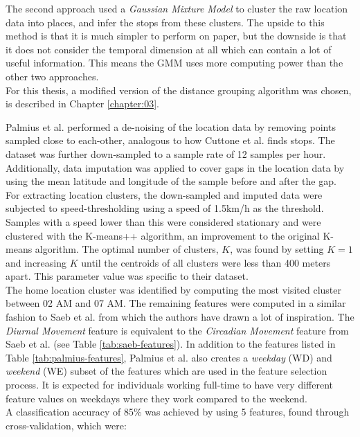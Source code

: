 The second approach used a \textit{Gaussian Mixture Model} to cluster the raw location data into places, and infer the stops from these clusters. The upside to this method is that it is much simpler to perform on paper, but the downside is that it does not consider the temporal dimension at all which can contain a lot of useful information. This means the GMM uses more computing power than the other two approaches. \\

For this thesis, a modified version of the distance grouping algorithm was chosen, is described in Chapter \ref{chapter:03}.

Palmius et al. performed a de-noising of the location data by removing points sampled close to each-other, analogous to how Cuttone et al. finds stops. The dataset was further down-sampled to a sample rate of 12 samples per hour. Additionally, data imputation was applied to cover gaps in the location data by using the mean latitude and longitude of the sample before and after the gap. \\

For extracting location clusters, the down-sampled and imputed data were subjected to speed-thresholding using a speed of 1.5km/h as the threshold. Samples with a speed lower than this were considered stationary and were clustered with the K-means++ algorithm, an improvement to the original K-means algorithm. The optimal number of clusters, $K$, was found by setting $K=1$ and increasing $K$ until the centroids of all clusters were less than 400 meters apart. This parameter value was specific to their dataset.\\

The home location cluster was identified by computing the most visited cluster between 02 AM and 07 AM. The remaining features were computed in a similar fashion to Saeb et al. from which the authors have drawn a lot of inspiration. The \textit{Diurnal Movement} feature is equivalent to the \textit{Circadian Movement }feature from Saeb et al. (see Table \ref{tab:saeb-features}). In addition to the features listed in Table \ref{tab:palmius-features}, Palmius et al. also creates a \textit{weekday} (WD) and \textit{weekend} (WE) subset of the features which are used in the feature selection process. It is expected for individuals working full-time to have very different feature values on weekdays where they work compared to the weekend.\\

A classification accuracy of 85\% was achieved by using 5 features, found through cross-validation, which were:

